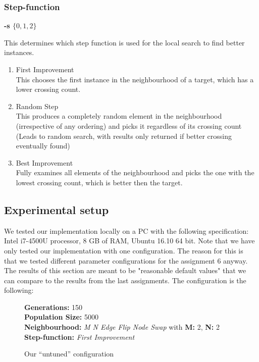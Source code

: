 \documentclass [11pt]{article}
\begin{document}
\subsubsection{Step-function} \textbf{-s $\{ 0,1,2\} $}

This determines which step function is used for the local search to find better instances. 

\begin{enumerate}
  \item First Improvement \\ 
  This chooses the first instance in the neighbourhood of a target, which has a lower crossing count. 
  \item Random Step \\ 
  This produces a completely random element in the neighbourhood (irrespective of any ordering) and picks it regardless of its crossing count (Leads to random search, with results only returned if better crossing eventually found)
  \item Best Improvement \\
  Fully examines all elements of the neighbourhood and picks the one with the lowest crossing count, which is better then the target. 
\end{enumerate}


\subsection{Experimental setup}


We tested our implementation locally on a PC with the following specification: Intel i7-4500U processor, 8 GB of RAM, Ubuntu 16.10 64 bit. Note that we have only tested our implementation with one configuration. The reason for this is that we tested different parameter configurations for the assignment 6 anyway. The results of this section are meant to be "reasonable default values" that we can compare to the results from the last assignments.
The configuration is the following:


\begin{figure}[H]
  \textbf{Generations:} 150 \\
\textbf{Population Size:} 5000 \\
\textbf{Neighbourhood:} \emph{M N Edge Flip Node Swap} with \textbf{M:} 2, \textbf{N:} 2\\
\textbf{Step-function:} \emph{First Improvement} 
\caption{Our ``untuned'' configuration}
\end{figure}
\end{document}
